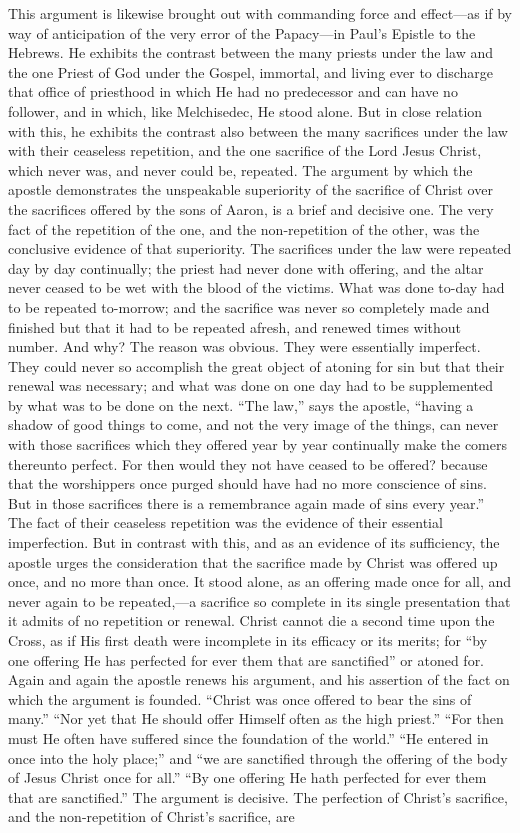 \documentclass[]{book}
\begin{document}
This argument is likewise brought out with commanding force and effect---as if by way of anticipation of the very error of the Papacy---in Paul's Epistle to the Hebrews. He exhibits the contrast between the many priests under the law and the one Priest of God under the Gospel, immortal, and living ever to discharge that office of priesthood in which He had no predecessor and can have no follower, and in which, like Melchisedec, He stood alone. But in close relation with this, he exhibits the contrast also between the many sacrifices under the law with their ceaseless repetition, and the one sacrifice of the Lord Jesus Christ, which never was, and never could be, repeated. The argument by which the apostle demonstrates the unspeakable superiority of the sacrifice of Christ over the sacrifices offered by the sons of Aaron, is a brief and decisive one. The very fact of the repetition of the one, and the non-repetition of the other, was the conclusive evidence of that superiority. The sacrifices under the law were repeated day by day continually; the priest had never done with offering, and the altar never ceased to be wet with the blood of the victims. What was done to-day had to be repeated to-morrow; and the sacrifice was never so completely made and finished but that it had to be repeated afresh, and renewed times without number. And why? The reason was obvious. They were essentially imperfect. They could never so accomplish the great object of atoning for sin but that their renewal was necessary; and what was done on one day had to be supplemented by what was to be done on the next. ``The law,'' says the apostle, ``having a shadow of good things to come, and not the very image of the things, can never with those sacrifices which they offered year by year continually make the comers thereunto perfect. For then would they not have ceased to be offered? because that the worshippers once purged should have had no more conscience of sins. But in those sacrifices there is a remembrance again made of sins every year.'' The fact of their ceaseless repetition was the evidence of their essential imperfection. But in contrast with this, and as an evidence of its sufficiency, the apostle urges the consideration that the sacrifice made by Christ was offered up once, and no more than once. It stood alone, as an offering made once for all, and never again to be repeated,---a sacrifice so complete in its single presentation that it admits of no repetition or renewal. Christ cannot die a second time upon the Cross, as if His first death were incomplete in its efficacy or its merits; for ``by one offering He has perfected for ever them that are sanctified'' or atoned for. Again and again the apostle renews his argument, and his assertion of the fact on which the argument is founded. ``Christ was once offered to bear the sins of many.'' ``Nor yet that He should offer Himself often as the high priest.'' ``For then must He often have suffered since the foundation of the world.'' ``He entered in once into the holy place;'' and ``we are sanctified through the offering of the body of Jesus Christ once for all.'' ``By one offering He hath perfected for ever them that are sanctified.'' The argument is decisive. The perfection of Christ's sacrifice, and the non-repetition of Christ's sacrifice, are 
\end{document}
